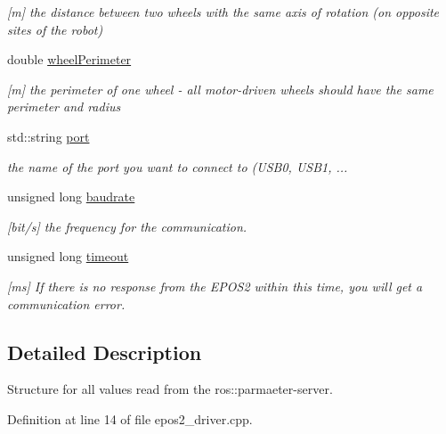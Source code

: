 \begin{DoxyCompactItemize}
\begin{DoxyCompactList}\small\item\em \mbox{[}m\mbox{]} the distance between two wheels with the same axis of rotation (on opposite sites of the robot) \end{DoxyCompactList}\item 
\hypertarget{structparameterStruct_a1869d72b411f51d29c68621b7c5777bb}{double \hyperlink{structparameterStruct_a1869d72b411f51d29c68621b7c5777bb}{wheel\-Perimeter}}\label{structparameterStruct_a1869d72b411f51d29c68621b7c5777bb}

\begin{DoxyCompactList}\small\item\em \mbox{[}m\mbox{]} the perimeter of one wheel -\/ all motor-\/driven wheels should have the same perimeter and radius \end{DoxyCompactList}\item 
std\-::string \hyperlink{structparameterStruct_aeae557e7b574ce3457b2089ed9599aa3}{port}
\begin{DoxyCompactList}\small\item\em the name of the port you want to connect to (U\-S\-B0, U\-S\-B1, ... \end{DoxyCompactList}\item 
unsigned long \hyperlink{structparameterStruct_a982408106af37061e986217861403eac}{baudrate}
\begin{DoxyCompactList}\small\item\em \mbox{[}bit/s\mbox{]} the frequency for the communication. \end{DoxyCompactList}\item 
unsigned long \hyperlink{structparameterStruct_afa1a24b4f578f635e115c817a5bc4c38}{timeout}
\begin{DoxyCompactList}\small\item\em \mbox{[}ms\mbox{]} If there is no response from the E\-P\-O\-S2 within this time, you will get a communication error. \end{DoxyCompactList}\end{DoxyCompactItemize}


\subsection{Detailed Description}
Structure for all values read from the ros\-::parmaeter-\/server. 

Definition at line 14 of file epos2\-\_\-driver.\-cpp.



